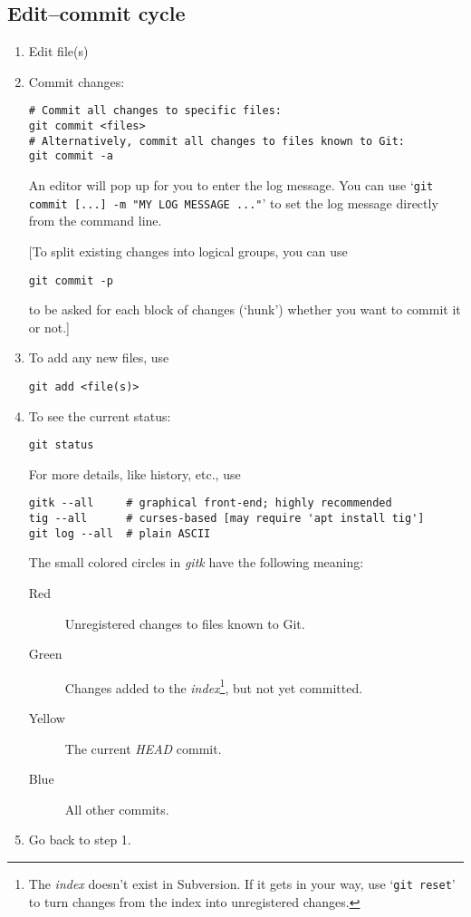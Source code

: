 \documentclass[12pt,pdftex]{article}
\begin{document}
\subsection{Edit–commit cycle}

\begin{enumerate}
\item Edit file(s)

\item Commit changes:
\begin{lstlisting}
# Commit all changes to specific files: 
git commit <files>
# Alternatively, commit all changes to files known to Git:
git commit -a
\end{lstlisting}

An editor will pop up for you to enter the log message.
You can use ‘\texttt{git commit [...] -m "MY LOG MESSAGE ..."}’ to set the log
message directly from the command line.

[To split existing changes into logical groups, you can use
\begin{lstlisting}
git commit -p
\end{lstlisting}
to be asked for each block of changes (‘hunk’) whether you want to
commit it or not.]

\item To add any new files, use
\begin{lstlisting}
git add <file(s)>
\end{lstlisting}

\item To see the current status:
\begin{lstlisting}
git status
\end{lstlisting}

For more details, like history, etc., use
\begin{lstlisting}
gitk --all     # graphical front-end; highly recommended
tig --all      # curses-based [may require 'apt install tig']
git log --all  # plain ASCII
\end{lstlisting}

The small colored circles in \emph{gitk} have the following meaning:
\begin{description}
\item[Red] Unregistered changes to files known to Git.
\item[Green] Changes added to the \emph{index}\footnote{%
    The \emph{index} doesn't exist in Subversion.
    If it gets in your way, use ‘\texttt{git reset}’ to turn changes from
    the index into unregistered changes.%
  }, but not yet committed.
\item[Yellow] The current \emph{HEAD} commit.
\item[Blue] All other commits.
\end{description}

\item Go back to step 1.
\end{enumerate}
\end{document}
